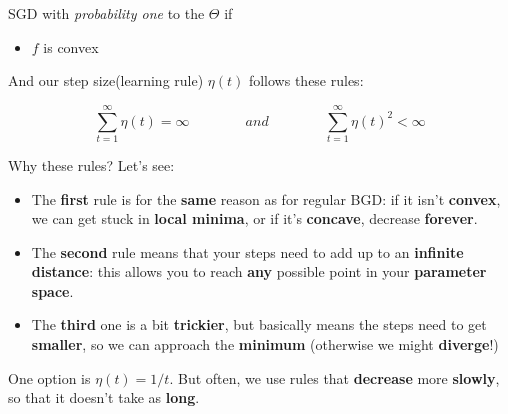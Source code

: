         \begin{theorem}
            SGD  with \textit{probability one} to the  $\Theta$ if
            
            \begin{itemize}
                \item $f$ is convex
            \end{itemize}
            
            And our step size(learning rule) $\eta(t)$ follows these rules:
            
            \begin{equation*}
                \sum_{t=1}^{\infty} \eta(t) = \infty
                \qquad \qquad
                and
                \qquad \qquad
                \sum_{t=1}^{\infty} \eta(t)^2 < \infty
            \end{equation*}
        \end{theorem}
        
        Why these rules? Let's see:
        
        \begin{itemize}
            \item The \textbf{first} rule is for the \textbf{same} reason as for regular BGD: if it isn't \textbf{convex}, we can get stuck in \textbf{local minima}, or if it's \textbf{concave}, decrease \textbf{forever}.
            
            \item The \textbf{second} rule means that your steps need to add up to an \textbf{infinite distance}: this allows you to reach \textbf{any} possible point in your \textbf{parameter space}.
            
            \item The \textbf{third} one is a bit \textbf{trickier}, but basically means the steps need to get \textbf{smaller}, so we can approach the \textbf{minimum} (otherwise we might \textbf{diverge}!)
        \end{itemize}
        
        One option is $\eta(t)=1/t$. But often, we use rules that \textbf{decrease} more \textbf{slowly}, so that it doesn't take as \textbf{long}.
